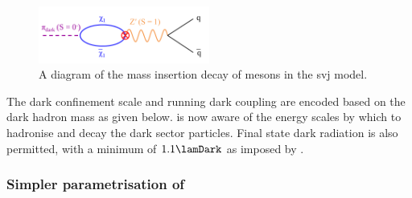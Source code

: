 
\begin{figure}[htbp]
    \centering
    \includegraphics[width=0.5\textwidth]{figures/mass_insertion_diagram.pdf}
    \caption[A diagram of the mass insertion decay of \Ppidark mesons in the \schannel semi-visible jet model]{A diagram of the mass insertion decay of \Ppidark mesons in the \schannel \gls{svj} model.}
    \label{fig:svj_mass_insertion}
\end{figure}

The dark confinement scale \lamDark and running dark coupling \aDark are encoded based on the dark hadron mass as given below. \PYTHIA is now aware of the energy scales by which to hadronise and decay the dark sector particles. Final state dark radiation is also permitted, with a minimum \pt of $\text{1.1}\lamDark$ as imposed by \PYTHIA.




\subsubsection{Simpler parametrisation of \texorpdfstring{\aDark}{alpha\_dark}}
\label{subsubsec:svj_effective_alpha_dark}

